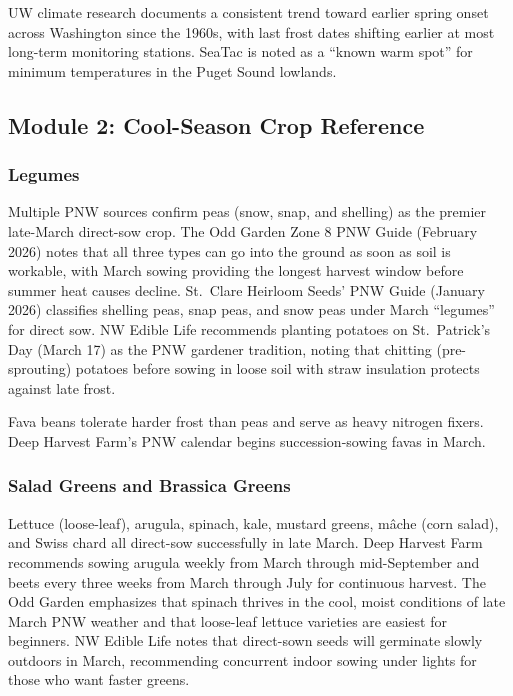 \documentclass[11pt,letterpaper]{article}
\begin{document}
UW climate research documents a consistent trend toward earlier spring onset across Washington since the 1960s, with last frost dates shifting earlier at most long-term monitoring stations. SeaTac is noted as a ``known warm spot'' for minimum temperatures in the Puget Sound lowlands.

\subsection{Module 2: Cool-Season Crop Reference}

\subsubsection{Legumes}

Multiple PNW sources confirm peas (snow, snap, and shelling) as the premier late-March direct-sow crop. The Odd Garden Zone 8 PNW Guide (February 2026) notes that all three types can go into the ground as soon as soil is workable, with March sowing providing the longest harvest window before summer heat causes decline. St.\ Clare Heirloom Seeds' PNW Guide (January 2026) classifies shelling peas, snap peas, and snow peas under March ``legumes'' for direct sow. NW Edible Life recommends planting potatoes on St.\ Patrick's Day (March 17) as the PNW gardener tradition, noting that chitting (pre-sprouting) potatoes before sowing in loose soil with straw insulation protects against late frost.

Fava beans tolerate harder frost than peas and serve as heavy nitrogen fixers. Deep Harvest Farm's PNW calendar begins succession-sowing favas in March.

\subsubsection{Salad Greens and Brassica Greens}

Lettuce (loose-leaf), arugula, spinach, kale, mustard greens, mâche (corn salad), and Swiss chard all direct-sow successfully in late March. Deep Harvest Farm recommends sowing arugula weekly from March through mid-September and beets every three weeks from March through July for continuous harvest. The Odd Garden emphasizes that spinach thrives in the cool, moist conditions of late March PNW weather and that loose-leaf lettuce varieties are easiest for beginners. NW Edible Life notes that direct-sown seeds will germinate slowly outdoors in March, recommending concurrent indoor sowing under lights for those who want faster greens.
\end{document}
